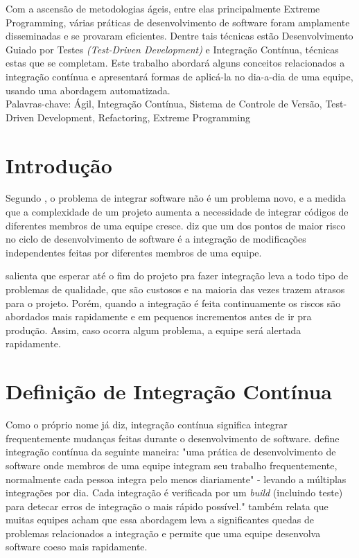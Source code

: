 \documentclass[10pt,a4paper,font=plain]{abnt}
\date{04 de março de 2010}
\begin{document}
\maketitle

\begin{resumo}
Com a ascensão de metodologias ágeis, entre elas principalmente Extreme Programming, várias práticas de desenvolvimento de software foram amplamente disseminadas e se provaram eficientes. Dentre tais técnicas estão Desenvolvimento Guiado por Testes \textit{(Test-Driven Development)}  e Integração Contínua, técnicas estas que se completam. Este trabalho abordará alguns conceitos relacionados a integração contínua e apresentará formas de aplicá-la no dia-a-dia de uma equipe, usando uma abordagem automatizada.\\

Palavras-chave: Ágil, Integração Contínua, Sistema de Controle de Versão, Test-Driven Development, Refactoring, Extreme Programming
\end{resumo}



\section{Introdução}

Segundo , o problema de integrar software não é um problema novo, e a medida que a complexidade de um projeto aumenta a necessidade de integrar códigos de diferentes membros de uma equipe cresce.  diz que um dos pontos de maior risco no ciclo de desenvolvimento de software é a integração de modificações independentes feitas por diferentes membros de uma equipe.

 salienta que esperar até o fim do projeto pra fazer integração leva a todo tipo de problemas de qualidade, que são custosos e na maioria das vezes trazem atrasos para o projeto. Porém, quando a integração é feita continuamente os riscos são abordados mais rapidamente e em pequenos incrementos antes de ir pra produção. Assim, caso ocorra algum problema, a equipe será alertada rapidamente.



\section{Definição de Integração Contínua}

Como o próprio nome já diz, integração contínua significa integrar frequentemente mudanças feitas durante o desenvolvimento de software.
 define integração contínua da seguinte maneira: "uma prática de desenvolvimento de software onde membros de uma equipe integram seu trabalho frequentemente, normalmente cada pessoa integra pelo menos diariamente" - levando a múltiplas integrações por dia. Cada integração é verificada por um \textit{build} (incluindo teste) para detecar erros de integração o mais rápido possível."  também relata que muitas equipes acham que essa abordagem leva a significantes quedas de problemas relacionados a integração e permite que uma equipe desenvolva software coeso mais rapidamente.
\end{document}
